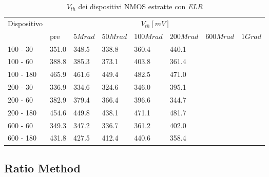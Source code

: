 \documentclass[12pt, letterpaper]{book}
\begin{document}
\begin{table}[H]
  \renewcommand{\arraystretch}{1.3}
    \begin{tabular}{m{2cm} m{0.8cm} m{1.1cm} m{1.3cm} m{1.5cm} m{1.5cm} m{1.5cm} m{1cm}}
      \toprule
      \multirow{2}{*}{Dispositivo} & \multicolumn{7}{c}{$V_{th} [mV] $}                                                                    \\
      \cmidrule{2-8}
                                   & pre  			& $5Mrad$ & $50Mrad$ & $100Mrad$ & $200Mrad$ & $600Mrad$ & $1Grad$ \\
      \midrule
      100 - 30                 	& 351.0      		& 348.5		& 338.8     	& 360.4 		& 440.1     	&      	&    \\
      \hline
      100 - 60                  	& 388.8            	& 385.3   	& 373.1   	& 403.8  	& 361.4     	&      	&    \\
	\hline
      100 - 180               	& 465.9          	& 461.6		& 449.4    	& 482.5    	& 471.0    	&     	&    \\
      \hline
      200 - 30 			& 336.9          	& 334.6   	& 324.6   	& 346.0    	& 395.1     	&    		&    \\
      \hline
      200 - 60                  	& 382.9			& 379.4  	& 366.4    	& 396.6    	& 344.7   	&     	&    \\
      \hline
      200 - 180                 	& 454.6     		& 449.8   	&438.1   	& 471.1   	& 481.7    	&      	&    \\
      \hline
      600 - 60              	& 349.3          	& 347.2    	&336.7    	& 361.2      	& 402.0    	&       	&    \\
      \hline
      600 - 180                	& 431.8             	& 427.5    	&412.4    	& 440.6     	& 358.4     	&       	&    \\
      \bottomrule
    \end{tabular}
  \caption{$V_{th}$ dei dispositivi NMOS estratte con \emph{ELR}}
  \label{tab:VthELRN}
\end{table}




\subsection{Ratio Method}
\end{document}
